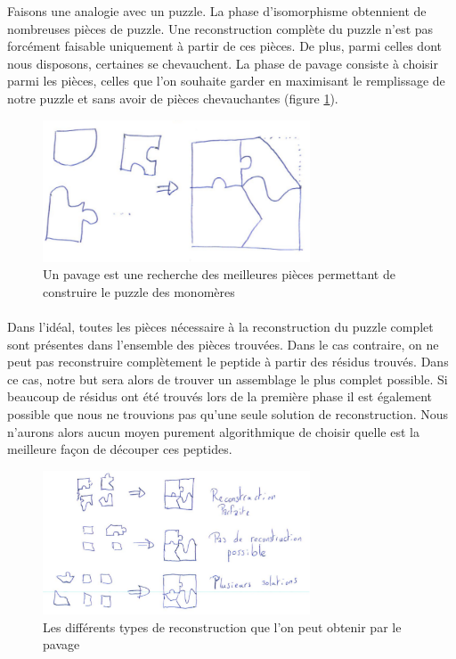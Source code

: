 \documentclass[12pt,french,twoside]{report}
\begin{document}
Faisons une analogie avec un puzzle. La phase d'isomorphisme obtennient de nombreuses pièces de puzzle.
Une reconstruction complète du puzzle n'est pas forcément faisable uniquement à partir de ces pièces.
De plus, parmi celles dont nous disposons, certaines se chevauchent.
La phase de pavage consiste à choisir parmi les pièces, celles que l'on souhaite garder en maximisant le remplissage de notre puzzle et sans avoir de pièces chevauchantes (figure \ref{puzzle}).

\begin{figure}
  \includegraphics[width=300px]{Figures/s2m/pavage/puzzle.pdf}
  \caption{\label{puzzle}Un pavage est une recherche des meilleures pièces permettant de construire le puzzle des monomères}
\end{figure}

\paragraph{}Dans l'idéal, toutes les pièces nécessaire à la reconstruction du puzzle complet sont présentes dans l'ensemble des
pièces trouvées. Dans le cas contraire, on ne peut pas reconstruire complètement le peptide à partir des résidus trouvés. 
Dans ce cas, notre
but sera alors de trouver un assemblage le plus complet possible. Si beaucoup de résidus ont été trouvés lors de la première phase
il est également possible que nous ne trouvions pas qu'une seule solution de reconstruction. Nous n'aurons alors aucun moyen
purement algorithmique de choisir quelle est la meilleure façon de découper ces peptides.

\begin{figure}
  \includegraphics[width=300px]{Figures/s2m/pavage/reconstructions.pdf}
  \caption{\label{reconstruction}Les différents types de reconstruction que l'on peut obtenir par le pavage}
\end{figure}
\end{document}

